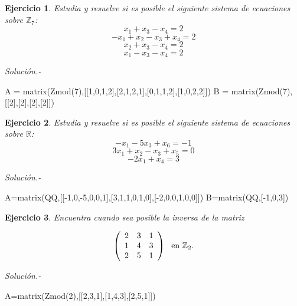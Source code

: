 \documentclass{amsart}
\newtheorem{ejer}{Ejercicio}
\def\r{\mathbb{R}}
\def\z{\mathbb{Z}}
\begin{document}
\begin{ejer} Estudia y resuelve si es posible el siguiente sistema de ecuaciones sobre $\z _7$:
\[ x_{1} + x_{3} - x_{4} = 2 \]
\[ -x_{1} + x_{2} - x_{3} + x_{4} = 2 \]
\[ x_{2} + x_{3} - x_{4} = 2 \]
\[ x_{1} - x_{3} - x_{4} = 2 \]
\end{ejer}

{\it Soluci\'on.- }

\begin{sageblock}
A = matrix(Zmod(7),[[1,0,1,2],[2,1,2,1],[0,1,1,2],[1,0,2,2]])
B = matrix(Zmod(7),[[2],[2],[2],[2]])

\end{sageblock}






\begin{ejer} Estudia y resuelve si es posible el siguiente sistema de ecuaciones sobre $\r $:
\[ -x_{1} - 5x_{3} + x_{6} = -1 \]
\[ 3x_{1} + x_{2} - x_{3} + x_{5} = 0 \]
\[ -2x_{1} + x_{4} = 3 \]

\end{ejer}

{\it Soluci\'on.- }

\begin{sageblock}
A=matrix(QQ,[[-1,0,-5,0,0,1],[3,1,1,0,1,0],[-2,0,0,1,0,0]])
B=matrix(QQ,[-1,0,3])

\end{sageblock}







\begin{ejer} Encuentra cuando sea posible la inversa de la matriz

\[ \left( \begin{array}{ccc}
2 & 3 & 1 \\
1 & 4 & 3 \\
2 & 5 & 1 \end{array} \right) \ \hbox{ en} \  \z _{2}. \] 

\end{ejer}

{\it Soluci\'on.- }

\begin{sageblock}
A=matrix(Zmod(2),[[2,3,1],[1,4,3],[2,5,1]])
\end{sageblock}
\end{document}
